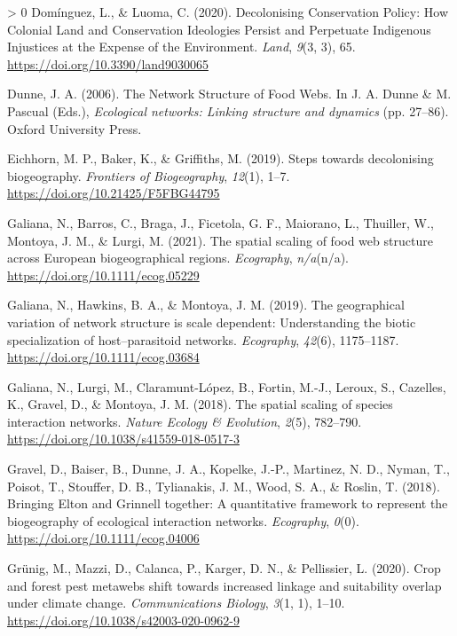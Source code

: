 \documentclass[11pt]{article}
\newlength{\cslhangindent}
\newenvironment{CSLReferences}[3] %
 {%
  \setlength{\parindent}{0pt}
  \ifodd #1 \everypar{\setlength{\hangindent}{\cslhangindent}}\ignorespaces\fi
  \ifnum #2 > 0
  \setlength{\parskip}{#2\baselineskip}
  \fi
 }%
 {}
\begin{document}
\begin{CSLReferences}{1}{0}
\leavevmode\hypertarget{ref-Dominguez2020DecCon}{}%
Domínguez, L., \& Luoma, C. (2020). Decolonising Conservation Policy:
How Colonial Land and Conservation Ideologies Persist and Perpetuate
Indigenous Injustices at the Expense of the Environment. \emph{Land},
\emph{9}(3, 3), 65. \url{https://doi.org/10.3390/land9030065}

\leavevmode\hypertarget{ref-Dunne2006NetStr}{}%
Dunne, J. A. (2006). The Network Structure of Food Webs. In J. A. Dunne
\& M. Pascual (Eds.), \emph{Ecological networks: Linking structure and
dynamics} (pp. 27--86). Oxford University Press.

\leavevmode\hypertarget{ref-Eichhorn2019SteDec}{}%
Eichhorn, M. P., Baker, K., \& Griffiths, M. (2019). Steps towards
decolonising biogeography. \emph{Frontiers of Biogeography},
\emph{12}(1), 1--7. \url{https://doi.org/10.21425/F5FBG44795}

\leavevmode\hypertarget{ref-Galiana2021SpaSca}{}%
Galiana, N., Barros, C., Braga, J., Ficetola, G. F., Maiorano, L.,
Thuiller, W., Montoya, J. M., \& Lurgi, M. (2021). The spatial scaling
of food web structure across European biogeographical regions.
\emph{Ecography}, \emph{n/a}(n/a).
\url{https://doi.org/10.1111/ecog.05229}

\leavevmode\hypertarget{ref-Galiana2019GeoVar}{}%
Galiana, N., Hawkins, B. A., \& Montoya, J. M. (2019). The geographical
variation of network structure is scale dependent: Understanding the
biotic specialization of host--parasitoid networks. \emph{Ecography},
\emph{42}(6), 1175--1187. \url{https://doi.org/10.1111/ecog.03684}

\leavevmode\hypertarget{ref-Galiana2018SpaSca}{}%
Galiana, N., Lurgi, M., Claramunt-López, B., Fortin, M.-J., Leroux, S.,
Cazelles, K., Gravel, D., \& Montoya, J. M. (2018). The spatial scaling
of species interaction networks. \emph{Nature Ecology \& Evolution},
\emph{2}(5), 782--790. \url{https://doi.org/10.1038/s41559-018-0517-3}

\leavevmode\hypertarget{ref-Gravel2018BriElt}{}%
Gravel, D., Baiser, B., Dunne, J. A., Kopelke, J.-P., Martinez, N. D.,
Nyman, T., Poisot, T., Stouffer, D. B., Tylianakis, J. M., Wood, S. A.,
\& Roslin, T. (2018). Bringing Elton and Grinnell together: A
quantitative framework to represent the biogeography of ecological
interaction networks. \emph{Ecography}, \emph{0}(0).
\url{https://doi.org/10.1111/ecog.04006}

\leavevmode\hypertarget{ref-Grunig2020CroFor}{}%
Grünig, M., Mazzi, D., Calanca, P., Karger, D. N., \& Pellissier, L.
(2020). Crop and forest pest metawebs shift towards increased linkage
and suitability overlap under climate change. \emph{Communications
Biology}, \emph{3}(1, 1), 1--10.
\url{https://doi.org/10.1038/s42003-020-0962-9}


\end{CSLReferences}
\end{document}
